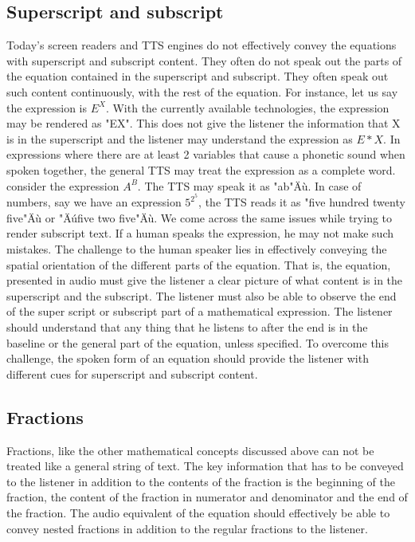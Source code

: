 \documentclass{article}
\begin{document}
\subsection{Superscript and subscript}
\label{ssec:supsub}
Today's screen readers and TTS engines do not effectively convey the equations with superscript and subscript content. They often do not speak out the parts of the equation contained in the superscript and subscript. They often speak out such content continuously, with the rest of the equation. For instance, let us say the expression is $E^X$. With the currently available technologies, the expression may be rendered as "EX". This does not give the listener the information that X is in the superscript and the listener may understand the expression as $E*X$. In expressions where there are at least 2 variables that cause a phonetic sound when spoken together, the general TTS may treat the expression as a complete word. consider the expression $A^B$. The TTS may speak it as "ab"Äù. In case of numbers, say we have an expression $5^{2^5}$, the TTS reads it as "five hundred twenty five"Äù or "Äúfive two five"Äù. We come across the same issues while trying to render subscript text. If a human speaks the expression, he may not make such mistakes. The challenge to the human speaker lies in effectively conveying the spatial orientation of the different parts of the equation. That is, the equation, presented in audio must give the listener a clear picture of what content is in the superscript and the subscript. The listener must also be able to observe the end of the super script or subscript part of a mathematical expression. The listener should understand that any thing that he listens to after the end is in the baseline or the general part of the equation, unless specified. To overcome this challenge, the spoken form of an equation should  provide the listener with different cues for superscript and subscript content.

\subsection{Fractions}
\label{ssec:fractions}
Fractions, like the other mathematical concepts discussed above can not be treated like a general string of text. The key information that has to be conveyed to the listener in addition to the contents of the fraction is the beginning of the fraction, the content of the fraction in numerator and denominator and the end of the fraction. The audio equivalent of the equation should effectively be able to convey nested fractions in addition to the regular fractions to the listener. \\
\end{document}

